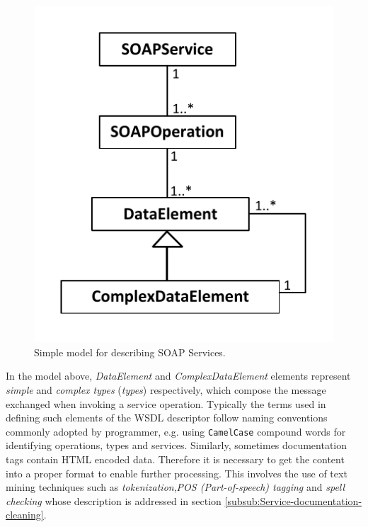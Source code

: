 \begin{figure}
\center\includegraphics[scale=0.6]{images/wsdl-simplified}

\caption{Simple model for describing SOAP Services.}
\label{wsdl-Simplified}

\end{figure}

In the model above, \emph{DataElement} and \emph{ComplexDataElement} elements represent \emph{simple }and\emph{ complex types} (\emph{types})
respectively, which compose the message exchanged when invoking a service operation. Typically the terms used in defining such elements of the WSDL descriptor follow naming conventions commonly adopted by programmer, e.g. using \texttt{CamelCase} compound words for identifying operations, types and services. Similarly, sometimes documentation tags contain HTML encoded data. Therefore it is necessary to get the content into a proper format to enable further processing. This involves the use of text mining techniques such as \emph{tokenization},\emph{POS (Part-of-speech) tagging } and \emph{spell checking} whose description is addressed in section \ref{subsub:Service-documentation-cleaning}.

